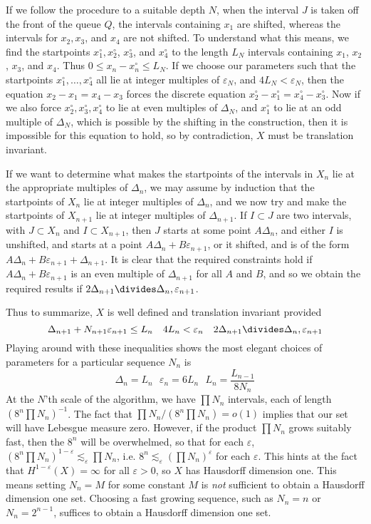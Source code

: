 \documentclass{report}
\theoremstyle{plain}
\theoremstyle{plain}
\begin{document}
If we follow the procedure to a suitable depth $N$, when the interval $J$ is taken off the front of the queue $Q$, the intervals containing $x_1$ are shifted, whereas the intervals for $x_2,x_3$, and $x_4$ are not shifted. To understand what this means, we find the startpoints $x_1^\circ, x_2^\circ$, $x_3^\circ$, and $x_4^\circ$ to the length $L_N$ intervals containing $x_1$, $x_2$, $x_3$, and $x_4$. Thus $0 \leq x_n - x_n^\circ \leq L_N$. If we choose our parameters such that the startpoints $x_1^\circ, \dots, x_4^\circ$ all lie at integer multiples of $\varepsilon_N$, and $4L_N < \varepsilon_N$, then the equation $x_2 - x_1 = x_4 - x_3$ forces the discrete equation $x_2^\circ - x_1^\circ = x_4^\circ - x_3^\circ$. Now if we also force $x_2^\circ, x_3^\circ, x_4^\circ$ to lie at even multiples of $\Delta_N$, and $x_1^\circ$ to lie at an odd multiple of $\Delta_N$, which is possible by the shifting in the construction, then it is impossible for this equation to hold, so by contradiction, $X$ must be translation invariant.

If we want to determine what makes the startpoints of the intervals in $X_n$ lie at the appropriate multiples of $\Delta_n$, we may assume by induction that the startpoints of $X_n$ lie at integer multiples of $\Delta_n$, and we now try and make the startpoints of $X_{n+1}$ lie at integer multiples of $\Delta_{n+1}$. If $I \subset J$ are two intervals, with $J \subset X_n$ and $I \subset X_{n+1}$, then $J$ starts at some point $A \Delta_n$, and either $I$ is unshifted, and starts at a point $A \Delta_n + B \varepsilon_{n+1}$, or it shifted, and is of the form $A \Delta_n + B \varepsilon_{n+1} + \Delta_{n+1}$. It is clear that the required constraints hold if $A \Delta_n + B \varepsilon_{n+1}$ is an even multiple of $\Delta_{n+1}$ for all $A$ and $B$, and so we obtain the required results if $2 \Delta_{n+1} \divides \Delta_n, \varepsilon_{n+1}$. 

Thus to summarize, $X$ is well defined and translation invariant provided
%
\[ \Delta_{n+1} + N_{n+1}\varepsilon_{n+1} \leq L_n\ \ \ 4L_n < \varepsilon_n\ \ \ 2\Delta_{n+1} \divides \Delta_n, \varepsilon_{n+1} \]
%
Playing around with these inequalities shows the most elegant choices of parameters for a particular sequence $N_n$ is
%
\[ \Delta_n = L_n\ \ \ \varepsilon_n = 6L_n\ \ \ L_n = \frac{L_{n-1}}{8N_n} \]
%
At the $N$'th scale of the algorithm, we have $\prod N_n$ intervals, each of length $(8^n \prod N_n)^{-1}$. The fact that $\prod N_n / (8^n \prod N_n) = o(1)$ implies that our set will have Lebesgue measure zero. However, if the product $\prod N_n$ grows suitably fast, then the $8^n$ will be overwhelmed, so that for each $\varepsilon$, $(8^n \prod N_n)^{1-\varepsilon} \lesssim_\varepsilon \prod N_n$, i.e. $8^n \lesssim_\varepsilon (\prod N_n)^\varepsilon$ for each $\varepsilon$. This hints at the fact that $H^{1-\varepsilon}(X) = \infty$ for all $\varepsilon > 0$, so $X$ has Hausdorff dimension one. This means setting $N_n = M$ for some constant $M$ is {\it not} sufficient to obtain a Hausdorff dimension one set. Choosing a fast growing sequence, such as $N_n = n$ or $N_n = 2^{n-1}$, suffices to obtain a Hausdorff dimension one set.
\end{document}
